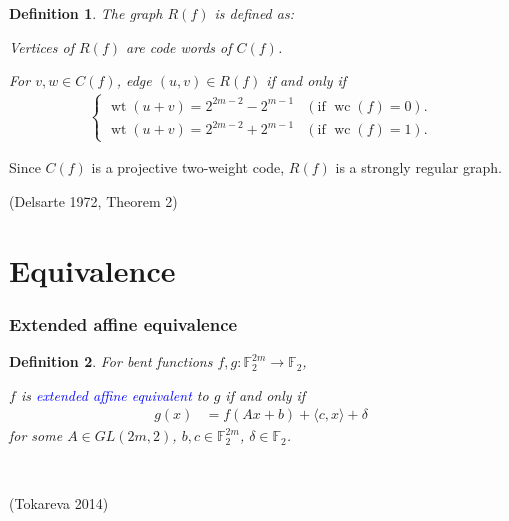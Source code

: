 \documentclass[pdf,sprung,slideColor,nocolorBG]{beamer}
\newenvironment{colortheme}[1]{
\def\ProvidesPackageRCS $##1${\relax}
\renewcommand{\ProcessOptions}{\relax}
\makeatletter

\makeatother
}{}
\newcommand{\slidecite}[1]{\tiny{(#1)}\normalsize{}}
\newcommand{\mb}[1]{\mathbb{#1}}
\newcommand{\Emph}[1]{\emph{\textcolor{blue}{#1}}}
\newcommand{\To}{\rightarrow}
\newcommand{\weight}[1]{\operatorname{wt}\left(#1\right)}
\newcommand{\weightclass}[1]{\operatorname{wc}\left(#1\right)}
\newcommand{\F}{\mb{F}}
\newtheorem{Def}{Definition}
\begin{document}
\begin{colortheme}{seagull}
\begin{frame}
\begin{Def}
The graph $R(f)$ is defined as:

Vertices of $R(f)$ are code words of $C(f)$.

For $v,w \in C(f)$, edge $(u,v) \in R(f)$ if and only if
\begin{align*}
\begin{cases}
\weight{u+v} = 2^{2m-2} - 2^{m-1} & (\text{if~}\weightclass{f}=0).
\\
\weight{u+v} = 2^{2m-2} + 2^{m-1} & (\text{if~}\weightclass{f}=1).
\end{cases}
\end{align*}

\end{Def}
Since $C(f)$ is a projective two-weight code,
$R(f)$ is a strongly regular graph.

\slidecite{Delsarte 1972, Theorem 2}
\end{frame}
\end{colortheme}

\section{Equivalence}

\begin{colortheme}{seagull}
\begin{frame}
\frametitle{Extended affine equivalence}

\begin{Def}
For bent functions $f,g : \F_2^{2m} \To \F_2$,

$f$ is \Emph{extended affine equivalent} to $g$ if and only if
\begin{align*}
g(x) &= f(A x + b) + \langle c, x \rangle + \delta
\end{align*}
for some $A \in GL(2m,2)$, $b, c \in \F_2^{2m}$, $\delta \in \F_2$.
\end{Def}
~

\slidecite{Tokareva 2014}
\end{frame}
\end{colortheme}
\end{document}
